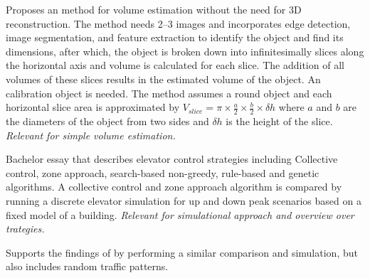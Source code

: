 






Proposes an method for volume estimation without the need for 3D reconstruction.
The method needs 2--3 images and incorporates edge
detection, image segmentation, and feature extraction to
identify the object and find its dimensions, after which,
the object is broken down into infinitesimally slices along
the horizontal axis and volume is calculated for each
slice. The addition of all volumes of these slices results in
the estimated volume of the object.
An calibration object is needed.
The method assumes a round object and each horizontal slice area is approximated by 
$V_{slice} = \pi \times \frac{a}{2} \times \frac{b}{2} \times \delta{}h$ 
where $a$ and $b$ are the diameters of the object from  two sides and $\delta{}h$ is the height of the slice.
\emph{Relevant for simple volume estimation.}





Bachelor essay that describes elevator control strategies including
Collective control, zone approach, search-based non-greedy, rule-based and genetic algorithms. A collective control and zone approach algorithm is compared by running a discrete elevator simulation for up and down peak scenarios based on a fixed model of a building. \emph{Relevant for simulational approach and overview over trategies.}


Supports the findings of \textcite{axelsson2013strategies} by performing a similar comparison and simulation, but also includes random traffic patterns. 



